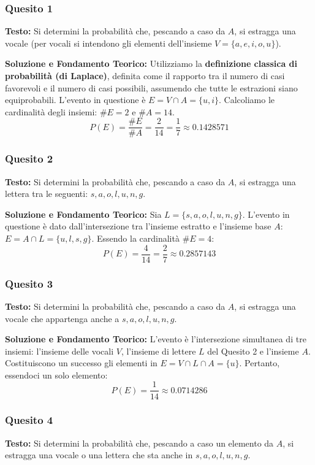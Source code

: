 \documentclass[12pt, a4paper]{article}
\begin{document}
\subsubsection*{Quesito 1}
\textbf{Testo:} Si determini la probabilità che, pescando a caso da $A$, si estragga una vocale (per vocali si intendono gli elementi dell'insieme $V=\{a,e,i,o,u\}$).

\textbf{Soluzione e Fondamento Teorico:} 
Utilizziamo la \textbf{definizione classica di probabilità (di Laplace)}, definita come il rapporto tra il numero di casi favorevoli e il numero di casi possibili, assumendo che tutte le estrazioni siano equiprobabili. 
L'evento in questione è $E = V \cap A = \{u, i\}$. 
Calcoliamo le cardinalità degli insiemi: $\#E = 2$ e $\#A = 14$.
$$ P(E) = \frac{\#E}{\#A} = \frac{2}{14} = \frac{1}{7} \approx 0.1428571 $$

\subsubsection*{Quesito 2}
\textbf{Testo:} Si determini la probabilità che, pescando a caso da $A$, si estragga una lettera tra le seguenti: $s, a, o, l, u, n, g$.

\textbf{Soluzione e Fondamento Teorico:} 
Sia $L = \{s,a,o,l,u,n,g\}$. L'evento in questione è dato dall'intersezione tra l'insieme estratto e l'insieme base $A$: $E = A \cap L = \{u,l,s,g\}$.
Essendo la cardinalità $\#E = 4$:
$$ P(E) = \frac{4}{14} = \frac{2}{7} \approx 0.2857143 $$

\subsubsection*{Quesito 3}
\textbf{Testo:} Si determini la probabilità che, pescando a caso da $A$, si estragga una vocale che appartenga anche a $s, a, o, l, u, n, g$.

\textbf{Soluzione e Fondamento Teorico:} 
L'evento è l'intersezione simultanea di tre insiemi: l'insieme delle vocali $V$, l'insieme di lettere $L$ del Quesito 2 e l'insieme $A$. Costituiscono un successo gli elementi in $E = V \cap L \cap A = \{u\}$. Pertanto, essendoci un solo elemento:
$$ P(E) = \frac{1}{14} \approx 0.0714286 $$

\subsubsection*{Quesito 4}
\textbf{Testo:} Si determini la probabilità che, pescando a caso un elemento da $A$, si estragga una vocale o una lettera che sta anche in $s, a, o, l, u, n, g$.
\end{document}
